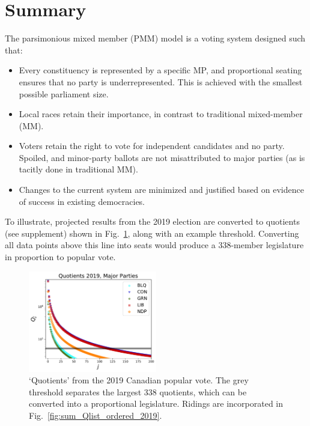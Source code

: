 \section*{Summary}
\renewcommand{\thefigure}{S-\arabic{figure}}

The parsimonious mixed member (PMM) model is a voting system designed such that:

\begin{itemize}
\item Every constituency is represented by a specific MP, and proportional seating ensures that no party is underrepresented. This is achieved with the smallest possible parliament size. 
\item Local races retain their importance, in contrast to traditional mixed-member (MM).
\item Voters retain the right to vote for independent candidates and no party. Spoiled, and minor-party ballots are not misattributed to major parties (as is tacitly done in traditional MM).
\item Changes to the current system are minimized and justified based on evidence of success in existing democracies.
\end{itemize}

To illustrate, projected results from the 2019 election are converted to quotients (see supplement) shown in Fig.~\ref{fig:sum_Qlist_byparty_2019}, along with an example threshold. Converting all data points above this line into seats would produce a 338-member legislature in proportion to popular vote. 
\begin{figure}[h!]
  \includegraphics[width=0.50\textwidth,clip]{PR_calcs/data/raw_2019/PMM_out/PMM_Qlist_byparty.pdf}
  \caption{`Quotients' from the 2019 Canadian popular vote. The grey threshold separates the largest 338 quotients, which can be converted into a proportional legislature. Ridings are incorporated in Fig.~\ref{fig:sum_Qlist_ordered_2019}. }
\label{fig:sum_Qlist_byparty_2019}
\end{figure}

